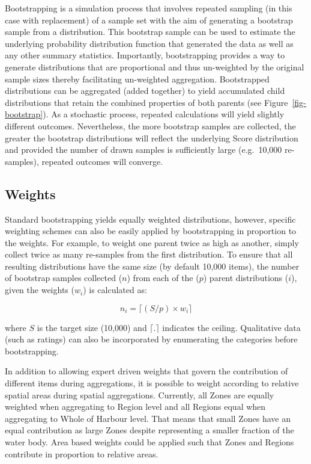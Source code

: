 \documentclass[
  8pt,
  a4paper]{article}
\begin{document}
Bootstrapping is a simulation process that involves repeated sampling
(in this case with replacement) of a sample set with the aim of
generating a bootstrap sample from a distribution. This bootstrap sample
can be used to estimate the underlying probability distribution function
that generated the data as well as any other summary statistics.
Importantly, bootstrapping provides a way to generate distributions that
are proportional and thus un-weighted by the original sample sizes
thereby facilitating un-weighted aggregation. Bootstrapped distributions
can be aggregated (added together) to yield accumulated child
distributions that retain the combined properties of both parents (see
Figure~\ref{fig-bootstrap}). As a stochastic process, repeated
calculations will yield slightly different outcomes. Nevertheless, the
more bootstrap samples are collected, the greater the bootstrap
distributions will reflect the underlying Score distribution and
provided the number of drawn samples is sufficiently large (e.g.~10,000
re-samples), repeated outcomes will converge.

\subsection{Weights}\label{weights}

Standard bootstrapping yields equally weighted distributions, however,
specific weighting schemes can also be easily applied by bootstrapping
in proportion to the weights. For example, to weight one parent twice as
high as another, simply collect twice as many re-samples from the first
distribution. To ensure that all resulting distributions have the same
size (by default 10,000 items), the number of bootstrap samples
collected (\(n\)) from each of the (\(p\)) parent distributions (\(i\)),
given the weights (\(w_i\)) is calculated as:

\[
n_i = \lceil(S/p)\times w_i \rceil
\]

where \(S\) is the target size (10,000) and \(\lceil.\rceil\) indicates
the ceiling. Qualitative data (such as ratings) can also be incorporated
by enumerating the categories before bootstrapping.

In addition to allowing expert driven weights that govern the
contribution of different items during aggregations, it is possible to
weight according to relative spatial areas during spatial aggregations.
Currently, all Zones are equally weighted when aggregating to Region
level and all Regions equal when aggregating to Whole of Harbour level.
That means that small Zones have an equal contribution as large Zones
despite representing a smaller fraction of the water body. Area based
weights could be applied such that Zones and Regions contribute in
proportion to relative areas.
\end{document}
